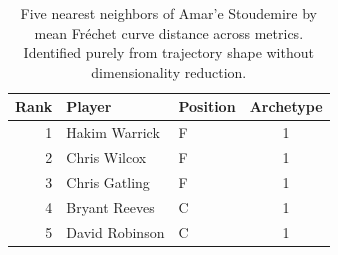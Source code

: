 \begin{table}[htbp]
  \centering\small
  \begin{tabular}{rllc}
    \toprule
    Rank & Player & Position & Archetype \\
    \midrule
    1 & Hakim Warrick & F & 1 \\
    2 & Chris Wilcox & F & 1 \\
    3 & Chris Gatling & F & 1 \\
    4 & Bryant Reeves & C & 1 \\
    5 & David Robinson & C & 1 \\
    \bottomrule
  \end{tabular}
  \caption{Five nearest neighbors of Amar'e Stoudemire by mean Fr\'{e}chet curve distance across metrics. Identified purely from trajectory shape without dimensionality reduction.}
  \label{tab:Amar_e_Stoudemire_frechet_curve_neighbors}
\end{table}

